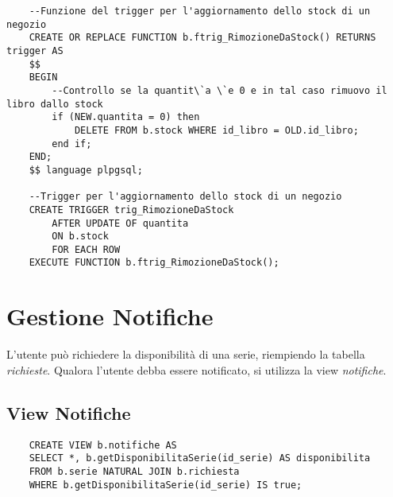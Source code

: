 \begin{lstlisting}
    --Funzione del trigger per l'aggiornamento dello stock di un negozio
    CREATE OR REPLACE FUNCTION b.ftrig_RimozioneDaStock() RETURNS trigger AS
    $$
    BEGIN
        --Controllo se la quantit\`a \`e 0 e in tal caso rimuovo il libro dallo stock
        if (NEW.quantita = 0) then
            DELETE FROM b.stock WHERE id_libro = OLD.id_libro;
        end if;
    END;
    $$ language plpgsql;
    
    --Trigger per l'aggiornamento dello stock di un negozio
    CREATE TRIGGER trig_RimozioneDaStock
        AFTER UPDATE OF quantita
        ON b.stock
        FOR EACH ROW
    EXECUTE FUNCTION b.ftrig_RimozioneDaStock();
\end{lstlisting}

\section{Gestione Notifiche}
L'utente pu\`o richiedere la disponibilit\`a di una serie, riempiendo la tabella \textit{richieste}. Qualora 
l'utente debba essere notificato, si utilizza la view \textit{notifiche}.

\subsection{View Notifiche}
\begin{lstlisting}
    CREATE VIEW b.notifiche AS
    SELECT *, b.getDisponibilitaSerie(id_serie) AS disponibilita
    FROM b.serie NATURAL JOIN b.richiesta
    WHERE b.getDisponibilitaSerie(id_serie) IS true;
\end{lstlisting}